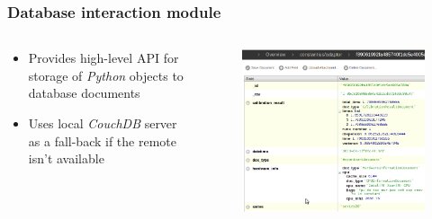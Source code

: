 \documentclass{beamer}
\begin{document}
\begin{frame}
\frametitle{Database interaction module}

	\begin{columns}[T]
		\begin{column}{0.5\textwidth}
			\begin{itemize}
				\item Provides high-level API for storage of \textit{Python} objects to database documents
				\item Uses local \textit{CouchDB} server as a fall-back if the remote isn't available
			\end{itemize}
		\end{column}
		\begin{column}{0.5\textwidth}
			\begin{figure}
				\includegraphics[width=\textwidth]{database-interaction}
			\end{figure}
		\end{column}
	\end{columns}

\end{frame}
\end{document}
